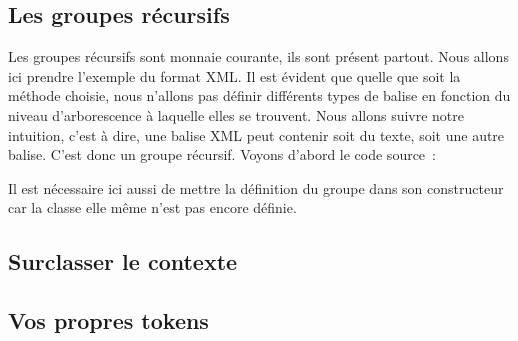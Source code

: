 \documentclass[a4paper]{article}
\begin{document}
        \subsection{Les groupes récursifs}
            Les groupes récursifs sont monnaie courante, ils sont présent
            partout. Nous allons ici prendre l'exemple du format XML. Il est
            évident que quelle que soit la méthode choisie, nous n'allons pas
            définir différents types de balise en fonction du niveau d'arborescence
            à laquelle elles se trouvent. Nous allons suivre notre intuition,
            c'est à dire, une balise XML peut contenir soit du texte, soit
            une autre balise. C'est donc un groupe récursif.
            Voyons d'abord le code source~:

            Il est nécessaire ici aussi de mettre la définition du groupe dans
            son constructeur car la classe elle même n'est pas encore définie.
        \subsection{Surclasser le contexte}
        \subsection{Vos propres tokens}
\end{document}
